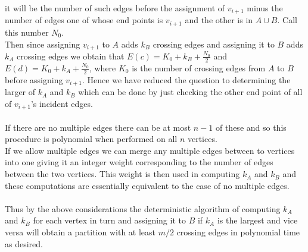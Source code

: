 it will be the number of such edges before the assignment of $v_{i+1}$
minus the number of edges one of whose end points is $v_{i+1}$ and the other is in $A \cup B$.
Call this number $N_0$. \\
Then since assigning $v_{i+1}$ to $A$ adds $k_B$ crossing edges and assigning it to $B$
adds $k_A$ crossing edges we obtain that
$E(c)=K_0+k_B+\frac{N_0}{2}$ and $E(d)=K_0+k_A+\frac{N_0}{2}$, 
where $K_0$ is the number of crossing edges from $A$ to $B$ before assigning $v_{i+1}$.
Hence we have reduced the question to determining the larger of $k_A$ and $k_B$
which can be done by just checking the other end point of all of $v_{i+1}$'s incident edges. \\ \\
If there are no multiple edges there can be at most $n-1$ of these and
so this procedure is polynomial when performed on all $n$ vertices. \\
If we allow multiple edges we can merge any multiple edges between to vertices into one
giving it an integer weight corresponding to the number of edges between the two vertices.
This weight is then used in computing $k_A$ and $k_B$ 
and these computations are essentially equivalent to the case of no multiple edges. \\ \\
Thus by the above considerations the deterministic algorithm of computing $k_A$ and $k_B$ 
for each vertex in turn and assigning it to $B$ if $k_A$ is the largest and vice versa
will obtain a partition with at least $m/2$ crossing edges in polynomial time as desired.
